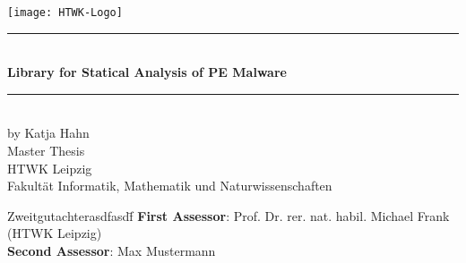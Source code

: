 \thispagestyle{empty}

\newlength{\oldtextwidth}		\setlength{\oldtextwidth}{\textwidth}
\newlength{\oldmarginparwidth}	\setlength{\oldmarginparwidth}{\marginparwidth}
\newlength{\oldparskip}			\setlength{\oldparskip}{\parskip}
\newlength{\oldparindent}		\setlength{\oldparindent}{\parindent}
\newlength{\oldhoffset}			\setlength{\oldhoffset}{\hoffset}

\setlength{\parskip}{0pt}
\setlength{\parindent}{0pt}

\begin{titlepage}
	\hfill{}
	\begin{minipage}{0.3\textwidth}
		\begin{flushright}
			\texttt{[image: HTWK-Logo]}\\[0cm]
		\end{flushright}
	\end{minipage}
	\vspace{1cm}
	\begin{center}
		\rule{\textwidth}{1.5pt}\\[0.5cm]
		{\Huge\bfseries Library for Statical Analysis of PE Malware}\\[0.5cm]
		\rule{\textwidth}{1.5pt}\\[1cm]
		{\Large by Katja Hahn}\\[1cm]
		{\Huge Master Thesis}\\[1cm]
		{\Large HTWK Leipzig}\\[0.75cm]
		{\Large Fakultät Informatik, Mathematik und Naturwissenschaften}\\[2cm]
	\end{center}
	\begin{tabbing}
		Zweitgutachterasdfasdf\=\kill
		{\bfseries First Assessor}: \>Prof. Dr. rer. nat. habil. Michael Frank (HTWK Leipzig)\\[0cm]
		{\bfseries Second Assessor}: \>Max Mustermann\\[1cm]
	\end{tabbing}
\end{titlepage}

\setlength{\textwidth}{\oldtextwidth}
\setlength{\marginparwidth}{\oldmarginparwidth}
\setlength{\parskip}{\oldparskip}
\setlength{\parindent}{\oldparindent}
\setlength{\hoffset}{\oldhoffset}
